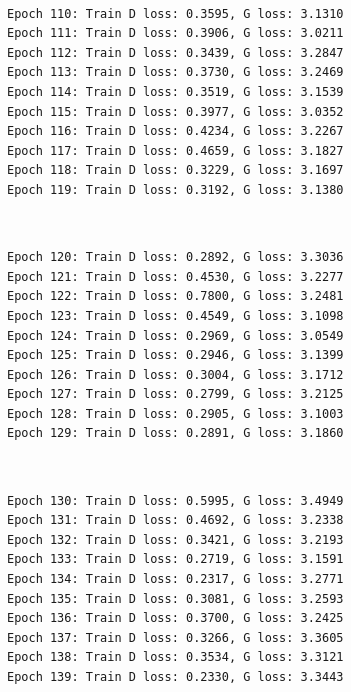 \documentclass[11pt]{article}
\begin{document}
    \begin{center}
    \end{center}
    { \hspace*{\fill} \\}
    
    \begin{Verbatim}[commandchars=\\\{\}]
Epoch 110: Train D loss: 0.3595, G loss: 3.1310
Epoch 111: Train D loss: 0.3906, G loss: 3.0211
Epoch 112: Train D loss: 0.3439, G loss: 3.2847
Epoch 113: Train D loss: 0.3730, G loss: 3.2469
Epoch 114: Train D loss: 0.3519, G loss: 3.1539
Epoch 115: Train D loss: 0.3977, G loss: 3.0352
Epoch 116: Train D loss: 0.4234, G loss: 3.2267
Epoch 117: Train D loss: 0.4659, G loss: 3.1827
Epoch 118: Train D loss: 0.3229, G loss: 3.1697
Epoch 119: Train D loss: 0.3192, G loss: 3.1380

    \end{Verbatim}

    \begin{center}
    \end{center}
    { \hspace*{\fill} \\}
    
    \begin{Verbatim}[commandchars=\\\{\}]
Epoch 120: Train D loss: 0.2892, G loss: 3.3036
Epoch 121: Train D loss: 0.4530, G loss: 3.2277
Epoch 122: Train D loss: 0.7800, G loss: 3.2481
Epoch 123: Train D loss: 0.4549, G loss: 3.1098
Epoch 124: Train D loss: 0.2969, G loss: 3.0549
Epoch 125: Train D loss: 0.2946, G loss: 3.1399
Epoch 126: Train D loss: 0.3004, G loss: 3.1712
Epoch 127: Train D loss: 0.2799, G loss: 3.2125
Epoch 128: Train D loss: 0.2905, G loss: 3.1003
Epoch 129: Train D loss: 0.2891, G loss: 3.1860

    \end{Verbatim}

    \begin{center}
    \end{center}
    { \hspace*{\fill} \\}
    
    \begin{Verbatim}[commandchars=\\\{\}]
Epoch 130: Train D loss: 0.5995, G loss: 3.4949
Epoch 131: Train D loss: 0.4692, G loss: 3.2338
Epoch 132: Train D loss: 0.3421, G loss: 3.2193
Epoch 133: Train D loss: 0.2719, G loss: 3.1591
Epoch 134: Train D loss: 0.2317, G loss: 3.2771
Epoch 135: Train D loss: 0.3081, G loss: 3.2593
Epoch 136: Train D loss: 0.3700, G loss: 3.2425
Epoch 137: Train D loss: 0.3266, G loss: 3.3605
Epoch 138: Train D loss: 0.3534, G loss: 3.3121
Epoch 139: Train D loss: 0.2330, G loss: 3.3443

    \end{Verbatim}
\end{document}
